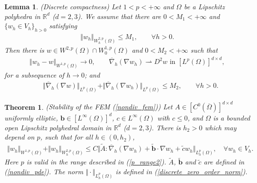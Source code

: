 \documentclass[10pt,a4paper]{amsart}
\newtheorem{theorem}{Theorem}
\newtheorem{lemma}{Lemma}
\begin{document}
\begin{lemma}
\label{lemma_conv_compactness} 
(Discrete compactness)
Let $1 < p < + \infty$ and $\Omega$ be a Lipschitz polyhedra in $\mathbb{R}^{d}$ 
($d=2,3$). We assume that there are $0 < M_{1} < +\infty$ and 
$\{w_{h} \in V_{h}\}_{h > 0}$ satisfying 
\begin{align*}
\Vert  w_{h} \Vert_{W_{h}^{2,p}(\Omega)} 
\leq M_{1}, \qquad \forall h > 0.
\end{align*} 
Then there is $w \in W^{2,p}(\Omega) \cap W_{0}^{1,p}(\Omega)$ and $ 0<M_{2}< + \infty$ 
such that 
\begin{align*}
\Vert w_{h} - w\Vert_{W^{1,p}(\Omega)} \rightarrow 0, \qquad 
\overline{\nabla}_{h}(\nabla w_{h}) \rightharpoonup D^{2}w \text{ in } 
[L^{p}(\Omega)]^{d \times d},
\end{align*}
for a subsequence of $h \rightarrow 0$; and 
\begin{align*}
\quad \Vert \overline{\nabla}_{h}(\nabla w) \Vert_{L^{p}(\Omega)} 
+ \Vert \overline{\nabla}_{h} (\nabla w_{h})\Vert_{L^{p}(\Omega)} 
\leq M_{2}, \qquad \forall h> 0.
\end{align*}
\end{lemma}

\begin{theorem}
\label{thm_global_estimate}
(Stability of the FEM (\ref{nondiv_fem})) 
Let $A \in [C^{0}(\overline{\Omega})]^{d\times d}$ uniformly elliptic, $\boldsymbol{b}\in 
[L^{\infty}(\Omega)]^{d}$, $c \in L^{\infty}(\Omega)$ with $c \leq 0$, 
 and $\Omega$ is a bounded open Lipschitz polyhedral domain in $\mathbb{R}^{d}$ ($d=2,3$).  
There is $h_{2} > 0$ which may depend on $p$, such that for all $h \in (0, h_{2})$,
\begin{align}
\label{global_estimate}
\Vert w_{h}\Vert_{W^{1,p}(\Omega)} + \Vert w_{h} \Vert_{W_{h}^{2,p}(\Omega)} 
\leq C \Vert \tilde{A}: \overline{\nabla}_{h}(\nabla w_{h}) +\tilde{\boldsymbol{b}}\cdot\nabla w_{h} 
+ \tilde{c} w_{h}\Vert_{L_{h}^{p}(\Omega)}, \quad \forall w_{h} \in V_{h}.
\end{align}
Here $p$ is valid in the range described in (\ref{p_range2}). 
$\tilde{A}$, $\tilde{\boldsymbol{b}}$ and $\tilde{c}$ are defined in (\ref{nondiv_pde}). 
The norm $\Vert \cdot \Vert_{L_{h}^{p}(\Omega)}$ is defined in (\ref{discrete_zero_order_norm}).
\end{theorem}
\end{document}
